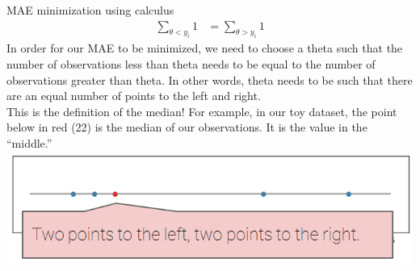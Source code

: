 \documentclass[aspectratio=169]{../latex_main/tntbeamer}  %
\begin{document}
	
	\begin{frame}{MAE minimization using calculus}
	    \begin{align*}
	        \sum\limits_{\theta < y_i} 1 &= \sum\limits_{\theta > y_i} 1
	    \end{align*}
	    In order for our MAE to be minimized, we need to choose a theta such that the number of observations less than theta needs to be equal to the number of observations greater than theta. In other words, theta needs to be such that there are an equal number of points to the left and right.\\
	    \bigskip
	    This is the definition of the median! For example, in our toy dataset, the point below in red (22) is the median of our observations. It is the value in the “middle.”\\
	    \hspace{4cm} \includegraphics[scale=.4]{Bild42}
	\end{frame}
	
\end{document}
